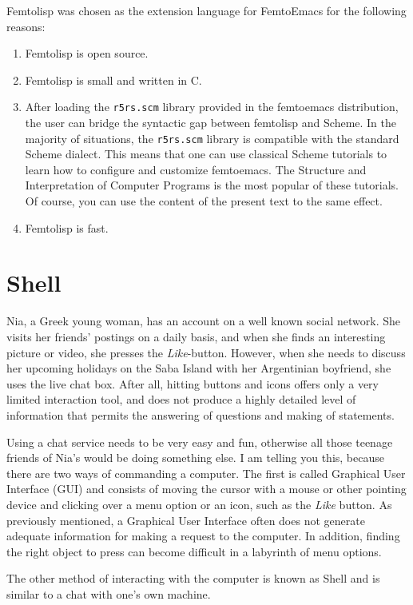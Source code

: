 \documentclass[a4paper,12pt]{book}
\begin{document}
Femtolisp was chosen
as the extension language
for FemtoEmacs for the following reasons:
\begin{enumerate}
\item Femtolisp is open source.
\item Femtolisp is small and written in C.
\item After loading the \verb|r5rs.scm| library
provided in the femtoemacs distribution,
the user can bridge the syntactic gap
between femtolisp and Scheme.
In the majority of situations, the \verb|r5rs.scm|
library is compatible
with the standard Scheme dialect. This means that
one can use classical Scheme tutorials to learn
how to configure and customize femtoemacs.
The Structure and Interpretation of Computer Programs
is the most popular of these tutorials.
Of course, you can use the content of the
present text to the same effect.
\item Femtolisp is fast.
\end{enumerate}    

\mainmatter


\chapter{Shell}
Nia, a Greek young woman, has an
account on a well known social network.
She visits her friends' postings on a daily basis,
and when she finds an interesting picture or video,
she presses the {\em Like}-button. However, when
she needs to discuss her upcoming holidays on the Saba Island
with her Argentinian boyfriend, she uses the
live chat box. After all, hitting buttons and
icons offers only a very limited interaction tool,
and does not produce a highly detailed
level of information that permits the answering
of questions and making of statements.


Using a chat service needs to
be very easy and fun, otherwise all those teenage
friends of Nia's would be doing something else.
I am telling you this, because there are
two ways of commanding a computer.
The first is called Graphical User Interface (GUI)
and consists of moving the cursor with a
mouse or other pointing device and clicking
over a menu option or an icon,
such as the {\em Like} button.
As previously mentioned, a Graphical User Interface
often does not generate adequate information
for making a request to the computer. In addition,
finding the right object  to press
can become difficult in a labyrinth of
menu options.

The other method of interacting with
the computer is known as Shell and is similar to
a chat with one's own machine.
\end{document}
